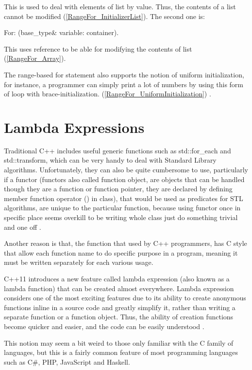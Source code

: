 \documentclass[11pt]{report}
\begin{document}
This is used to deal with elements of list by value. Thus, the contents of a list cannot be modified (\ref{RangeFor_InitializerList}). The second one is:
\begin{center}
For: (base\_type\& variable: container).
\end{center}

This uses reference to be able for modifying the contents of list (\ref{RangeFor_Array}).


The range-based for statement also supports the notion of uniform initialization, for instance, a programmer can simply print a lot of numbers by using this form of loop with brace-initialization. (\ref{RangeFor_UniformInitialization}) \cite{Overland:2011:CWF}.

\section{Lambda Expressions}
\label{section: Lambda Expressions}
Traditional C++ includes useful generic functions such as std::for\_each and std::transform, which can be very handy to deal with Standard Library algorithms.  Unfortunately, they can also be quite cumbersome to use, particularly if a functor (functors also called function object, are objects that can be handled though they are a function or function pointer, they are declared by defining member function operator () in class), that would be used as predicates for STL algorithms, are unique to the particular function, because using functor once in specific place seems overkill to be writing whole class just do something trivial and one off \cite{Allain:2011:FutureCpp}. 


Another reason is that, the function that used by C++ programmers, has C style that  allow each function name to do specific purpose in a program, meaning it must be written separately for each various usage.


C++11 introduces a new feature called lambda expression (also known as a lambda function) that can be created almost everywhere. Lambda expression considers one of the most exciting features due to its ability to create anonymous functions inline in a source code and greatly simplify it, rather than writing a separate function or a function object.  Thus, the ability of creation functions become quicker and easier, and the code can be easily understood \cite{Gregorie:professionalcpp}.


This notion may seem a bit weird to those only familiar with the C family of languages, but this is a fairly common feature of most programming languages such as C\#, PHP, JavaScript and Haskell.  
\end{document}
